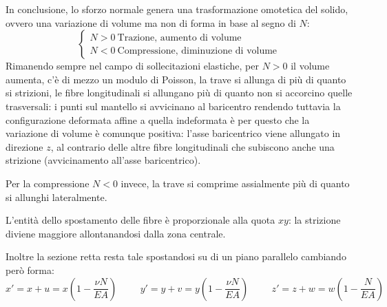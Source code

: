 	In conclusione, lo sforzo normale genera una trasformazione omotetica del solido, ovvero una variazione di volume ma non di forma in base al segno di $N$:
	\[ \begin{cases}
		N>0 ~ \text{Trazione, aumento di volume} \\
		N<0 ~ \text{Compressione, diminuzione di volume}
	\end{cases}
	\]
	Rimanendo sempre nel campo di sollecitazioni elastiche,
	per $ N>0 $ il volume aumenta, c'è di mezzo un modulo di Poisson, la trave si allunga di più di quanto si strizioni, le fibre longitudinali si allungano più di quanto non si
	accorcino quelle trasversali: i punti sul mantello si avvicinano al baricentro rendendo tuttavia la configurazione deformata affine a quella indeformata è per questo che la variazione di volume è comunque positiva: l’asse baricentrico viene allungato in direzione $ z $, al contrario delle altre fibre longitudinali che subiscono
	anche una strizione (avvicinamento all’asse baricentrico).
	
	Per la compressione $ N<0 $ invece, la trave si comprime assialmente più di quanto si allunghi lateralmente. \newline
	
	L'entità dello spostamento delle fibre è proporzionale alla quota $xy$: la strizione diviene maggiore allontanandosi dalla zona centrale. \newline
	
	Inoltre la sezione retta resta tale spostandosi su di un piano parallelo cambiando però forma:
	\[ x' = x + u = x \left(1-\dfrac{\nu N}{EA}\right) \hspace{1cm } y' = y + v = y \left(1-\dfrac{\nu N}{EA}\right) \hspace{1cm } z' = z + w = w \left(1-\dfrac{ N}{EA}\right)\]
	

